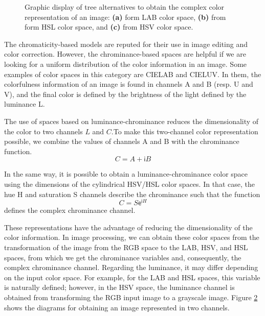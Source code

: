 \documentclass[journal]{IEEEtran}
\newcommand{\captext}[1]{\small{\textbf{\textsf{#1}}}}
\begin{document}
\begin{figure}[!ht]
\begin{subfigure}[b]{0.22\textwidth}
		\caption{ }	
		\label{fig:hsv_complex_color}
	\end{subfigure}
	
	\caption{Graphic display of tree alternatives to obtain the complex color representation of an image: \captext{(a)} form LAB color space, \captext{(b)} from form HSL color space, and \captext{(c)} from HSV color space.}
	\label{fig:complex_color_spaces}
\end{figure}

The chromaticity-based models are reputed for their use in image editing and color correction. However, the chrominance-based spaces are helpful if we are looking for a uniform distribution of the color information in an image. Some examples of color spaces in this category are CIELAB and CIELUV. In them, the colorfulness information of an image is found in channels A and B (resp. U and V), and the final color is defined by the brightness of the light defined by the luminance L.

The use of spaces based on luminance-chrominance reduces the dimensionality of the color to two channels $L$ and $C$.To make this two-channel color representation possible, we combine the values of channels A and B with the chrominance function.
\begin{equation}\label{eq:chrominance_lab}
    C = A + \mathsf{i}B
\end{equation}

In the same way, it is possible to obtain a luminance-chrominance color space using the dimensions of the cylindrical HSV/HSL color spaces. In that case, the hue H and saturation S channels describe the chrominance such that the function
\begin{equation}\label{eq:chrominance_hsv}
    C = S \mathsf{e}^{\mathsf{i}H}
\end{equation}
defines the complex chrominance channel.

These representations have the advantage of reducing the dimensionality of the color information. In image processing, we can obtain these color spaces from the transformation of the image from the RGB space to the LAB, HSV, and HSL spaces, from which we get the chrominance variables and, consequently, the complex chrominance channel. Regarding the luminance, it may differ depending on the input color space. For example, for the LAB and HSL spaces, this variable is naturally defined; however, in the HSV space, the luminance channel is obtained from transforming the RGB input image to a grayscale image. Figure \ref{fig:complex_color_spaces} shows the diagrams for obtaining an image represented in two channels.
\end{document}
